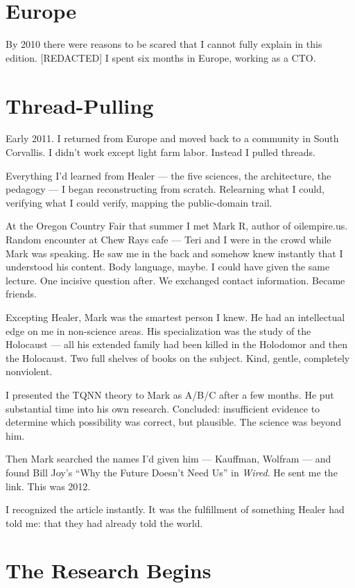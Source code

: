 \section*{Europe}
\label{pos29:europe}

By 2010 there were reasons to be scared that I cannot fully explain in this edition. [REDACTED] I spent six months in Europe, working as a CTO.

\section*{Thread-Pulling}
\label{pos29:thread-pulling}

Early 2011. I returned from Europe and moved back to a community in South Corvallis. I didn't work except light farm labor. Instead I pulled threads.

Everything I'd learned from Healer --- the five sciences, the architecture, the pedagogy --- I began reconstructing from scratch. Relearning what I could, verifying what I could verify, mapping the public-domain trail.

At the Oregon Country Fair that summer I met Mark R, author of oilempire.us. Random encounter at Chew Rays cafe --- Teri and I were in the crowd while Mark was speaking. He saw me in the back and somehow knew instantly that I understood his content. Body language, maybe. I could have given the same lecture. One incisive question after. We exchanged contact information. Became friends.

Excepting Healer, Mark was the smartest person I knew. He had an intellectual edge on me in non-science areas. His specialization was the study of the Holocaust --- all his extended family had been killed in the Holodomor and then the Holocaust. Two full shelves of books on the subject. Kind, gentle, completely nonviolent.

I presented the TQNN theory to Mark as A/B/C after a few months. He put substantial time into his own research. Concluded: insufficient evidence to determine which possibility was correct, but plausible. The science was beyond him.

Then Mark searched the names I'd given him --- Kauffman, Wolfram --- and found Bill Joy's ``Why the Future Doesn't Need Us'' in \textit{Wired}. He sent me the link. This was 2012.

I recognized the article instantly. It was the fulfillment of something Healer had told me: that they had already told the world.

\section*{The Research Begins}
\label{pos29:the-research-begins}

